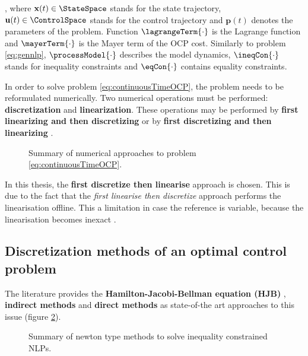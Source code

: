 \noindent , where $\mathbf{x}(t) \in \StateSpace$ stands for the state trajectory, $\mathbf{u}(t) \in \ControlSpace$ stands for the control trajectory and $\mathbf{p}(t)$ denotes the parameters of the problem. Function $\lagrangeTerm{\cdot}$ is the Lagrange function and $\mayerTerm{\cdot}$ is the Mayer term of the OCP cost. Similarly to problem \eqref{eq:gennlp}, $\processModel{\cdot}$ describes the model dynamics,  $\ineqCon{\cdot}$ stands for inequality constraints and $\eqCon{\cdot}$ contains equality constraints.

In order to solve problem \eqref{eq:continuousTimeOCP}, the problem needs to be reformulated numerically. Two numerical operations must be performed: \textbf{discretization} and \textbf{linearization}. These operations may be performed by \textbf{first linearizing and then discretizing} or by \textbf{first discretizing and then linearizing} \cite{gros2020linear}.

\begin{figure}[h]
\centering
{}
\caption{Summary of numerical approaches to problem \eqref{eq:continuousTimeOCP}.}
\label{fig:summarynumapproaches}
\end{figure}

In this thesis, the \textbf{first discretize then linearise} approach is chosen. This is due to the fact that the \textit{first linearise then discretize} approach performs the linearisation offline. This a limitation in case the reference is variable, because the linearisation becomes inexact \cite{gros2020linear}.

\subsection{Discretization methods of an optimal control problem}
\label{subsection:ocpdiscretization}

The literature provides the \textbf{Hamilton-Jacobi-Bellman equation (HJB)} , \textbf{indirect methods} and \textbf{direct methods} as state-of-the art approaches to this issue (figure \ref{fig:summarydiscretizationapproaches}).

\begin{figure}[h]
\centering
{}
\caption{Summary of newton type methods to solve inequality constrained NLPs.}
\label{fig:summarydiscretizationapproaches}
\end{figure}

